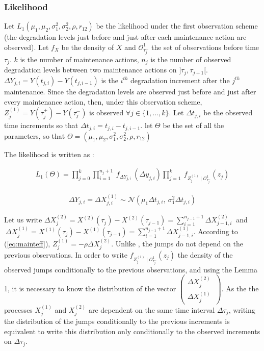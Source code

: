 \subsubsection{Likelihood}

Let $L_1(\mu_1,\mu_2,\sigma_1^2,\sigma_2^2,\rho,r_{12})$ be the likelihood under the first observation scheme (the degradation levels just before and just after each maintenance action are observed).
Let $f_X$ be the density of $X$ and $\mathcal{O}^1_{\tau_j^-}$ the set of observations before time $\tau_j$. $k$ is the number of maintenance actions, $n_j$ is the number of observed degradation levels between two maintenance actions on $]\tau_j,\tau_{j+1}[$. $\Delta Y_{j,i}=Y(t_{j,i})-Y(t_{j,i-1})$ is the $i^{th}$ degradation increment after the $j^{th}$ maintenance. Since the degradation levels are observed just before and just after every maintenance action, then, under this observation scheme, $Z_j^{(1)}=Y(\tau_j^+)-Y(\tau_j^-)$ is observed $\forall j \in \{1,...,k\}$. Let $\Delta t_{j,i}$ be the observed time increments so that $\Delta t_{j,i}=t_{j,i}-t_{j,i-1}$. let $\Theta$ be the set of all the parameters, so that $\Theta=(\mu_1, \mu_2, \sigma_1^2, \sigma_2^2,\rho, r_{12})$


\noindent The likelihood is written as :

\begin{align}
\displaystyle L_1(\Theta)= \prod \limits_{j=0}^k \prod \limits_{i=1}^{n_{j}+1} \ f_{\Delta Y_{j,i}}\ (\Delta y_{j,i})\prod \limits_{j=1}^k \ f_{Z_j^{(1)} \mid \mathcal{O}^1_{\tau_j^-}}(z_j) 
\end{align}


\begin{align}
\Delta Y_{j,i}=\Delta X^{(1)}_{j,i}\sim \mathcal{N}\left(\mu_1 \Delta t_{j,i},\ \sigma_1^2 \Delta t_{j,i}\right)
\label{eq:inc}
\end{align}


\noindent Let us write  $\Delta X^{(2)}_j=X^{(2)}(\tau_j)-X^{(2)}(\tau_{j-1})=\sum \limits_{i=1}^{n_{j-1}+1} \Delta X^{(2)}_{j-1,i}\ $ and $\ \Delta X^{(1)}_j=X^{(1)}(\tau_j)-X^{(1)}(\tau_{j-1})=\sum \limits_{i=1}^{n_{j-1}+1} \Delta X^{(1)}_{j-1,i}$. According to (\ref{eq:mainteff}), $Z_j^{(1)}=-\rho \Delta X^{(2)}_j$. Unlike \cite{leroy_statistical_2022}, the jumps do not depend on the previous observations. In order to write $f_{Z_j^{(1)} \mid \mathcal{O}^1_{\tau_j^-}}(z_j)$ the density of the observed jumps conditionally to the previous observations, and using the Lemma 1, it is necessary to know the distribution of the vector $\begin{pmatrix}
 \Delta X^{(2)}_j\ \\
   \Delta X^{(1)}_j
\end{pmatrix}$.  As the the processes $X^{(1)}_j$ and $X^{(2)}_j$ are dependent on the same time interval $\Delta \tau_j$, writing the distribution of the jumps conditionally to the previous increments is equivalent to write this distribution only conditionally to the observed increments on $\Delta \tau_j$.\\


